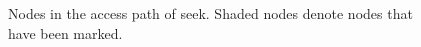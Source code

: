 \begin{figure}[t]
{
}
\caption{Nodes in the access path of seek. Shaded nodes denote nodes that have been marked.}
\label{fig:seek}
\end{figure}


